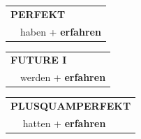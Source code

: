 \documentclass[10pt,a4paper]{revtex4-2}
\begin{document}
\begin{verbbox-acc}
    \vspace{10pt}

 \begin{tabular}{rl}
     \multicolumn{2}{l}{\textbf{PERFEKT}}\\
  &  haben + \textbf{erfahren}\\
  \end{tabular}
\hfill
   \begin{tabular}{rl}
   
    \multicolumn{2}{l}{\textbf{FUTURE I} }\\
  &  werden + \textbf{erfahren}\\
 
  \end{tabular}
\hfill
   \begin{tabular}{rl}
      \multicolumn{2}{l}{\textbf{PLUSQUAMPERFEKT}}\\
  &  hatten + \textbf{erfahren}\\
  \end{tabular}
  
  \vspace{-5pt}

\end{verbbox-acc}
\end{document}
